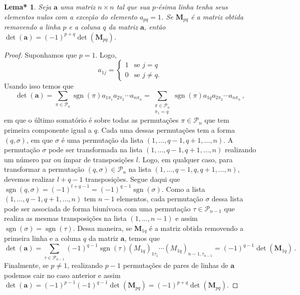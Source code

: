 \documentclass[12pt,a4paper]{report}
\newcommand{\mb}{\mathbf}
\newcommand{\mc}{\mathcal}
\newtheorem{lem*}[thm]{Lema*}
\DeclareMathOperator{\sgn}{sgn}
\begin{document}
\begin{lem*}
  \label{det.minor1}
  Seja $\mb a$ uma matriz $n\times n$ tal que sua $p$-ésima linha tenha seus elementos nulos com a exceção do elemento $a_{pq}=1$. Se $\mb M_{pq}$ é a matriz obtida removendo a linha $p$ e a coluna $q$ da matriz $\mb a$, então $\det(\mb a)=(-1)^{p+q}\det(\mb M_{pq})$.
\end{lem*}
\begin{proof}
  Suponhamos que $p=1$. Logo,
  $$a_{1j}=\begin{cases}
    1&\text{se $j=q$}\\
    0&\text{se $j\ne q$.}
  \end{cases}$$
  Usando isso temos que
  $$\det(\mb a)=\sum_{\pi\in\mc P_n}\sgn(\pi)a_{1\pi_1}a_{2\pi_2}\cdots a_{n\pi_n}=\sum_{\substack{\pi\in\mc P_n\\\pi_1=q}}\sgn(\pi)a_{1q}a_{2\pi_2}\cdots a_{n\pi_n}\,,$$
  em que o último somatório é sobre todas as permutações $\pi\in\mc P_n$ que tem primeira componente igual a $q$. Cada uma dessas permutações tem a forma $(q,\sigma)$, em que $\sigma$ é uma permutação da lista $(1,\ldots,q-1,q+1,\ldots,n)$.
  A permutação $\sigma$ pode ser transformada na lista $(1,\ldots,q-1,q+1,\ldots,n)$ realizando um número par ou ímpar de transposições $l$. Logo, em qualquer caso, para transformar a permutação $(q,\sigma)\in\mc P_n$ na lista $(1,\ldots,q-1,q,q+1,\ldots,n)$, devemos realizar $l+q-1$ transposições. Segue daqui que $\sgn(q,\sigma)=(-1)^{l+q-1}=(-1)^{q-1}\sgn(\sigma)$.
  Como a lista $(1,\ldots,q-1,q+1,\ldots,n)$ tem $n-1$ elementos, cada permutação $\sigma$ dessa lista pode ser associada de forma biunívoca com uma permutação $\tau\in\mc P_{n-1}$ que realiza as mesmas transposições na lista $(1,\ldots,n-1)$ e assim $\sgn(\sigma)=\sgn(\tau)$. Dessa maneira, se $\mb M_{1q}$ é a matriz obtida removendo a primeira linha e a coluna $q$ da matriz $\mb a$, temos que
  $$\det(\mb a)=\sum_{\tau\in\mc P_{n-1}}(-1)^{q-1}\sgn(\tau)(M_{1q})_{1\tau_1}\cdots (M_{1q})_{n-1,\tau_{n-1}}=(-1)^{q-1}\det(\mb M_{1q})\,.$$
  Finalmente, se $p\ne 1$, realizando $p-1$ permutações de pares de linhas de $\mb a$ podemos cair no caso anterior e assim $\det(\mb a)=(-1)^{p-1}(-1)^{q-1}\det(\mb M_{pq})=(-1)^{p+q}\det(\mb M_{pq})$.
\end{proof}
\end{document}
